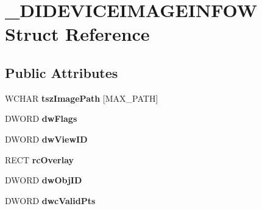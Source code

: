 \hypertarget{struct___d_i_d_e_v_i_c_e_i_m_a_g_e_i_n_f_o_w}{\section{\-\_\-\-D\-I\-D\-E\-V\-I\-C\-E\-I\-M\-A\-G\-E\-I\-N\-F\-O\-W Struct Reference}
\label{struct___d_i_d_e_v_i_c_e_i_m_a_g_e_i_n_f_o_w}
}
\subsection*{Public Attributes}
\begin{DoxyCompactItemize}
\item 
\hypertarget{struct___d_i_d_e_v_i_c_e_i_m_a_g_e_i_n_f_o_w_a1b0076cce4e640ed61f6c221c0fc1f78}{W\-C\-H\-A\-R {\bfseries tsz\-Image\-Path} \mbox{[}M\-A\-X\-\_\-\-P\-A\-T\-H\mbox{]}}\label{struct___d_i_d_e_v_i_c_e_i_m_a_g_e_i_n_f_o_w_a1b0076cce4e640ed61f6c221c0fc1f78}

\item 
\hypertarget{struct___d_i_d_e_v_i_c_e_i_m_a_g_e_i_n_f_o_w_a372c889d76f5a3b44fdae9a030ad04ff}{D\-W\-O\-R\-D {\bfseries dw\-Flags}}\label{struct___d_i_d_e_v_i_c_e_i_m_a_g_e_i_n_f_o_w_a372c889d76f5a3b44fdae9a030ad04ff}

\item 
\hypertarget{struct___d_i_d_e_v_i_c_e_i_m_a_g_e_i_n_f_o_w_a2ee07bbebb3b016026c959537b892cff}{D\-W\-O\-R\-D {\bfseries dw\-View\-I\-D}}\label{struct___d_i_d_e_v_i_c_e_i_m_a_g_e_i_n_f_o_w_a2ee07bbebb3b016026c959537b892cff}

\item 
\hypertarget{struct___d_i_d_e_v_i_c_e_i_m_a_g_e_i_n_f_o_w_acad0625bd806762d89f5dbcf1d0720a0}{R\-E\-C\-T {\bfseries rc\-Overlay}}\label{struct___d_i_d_e_v_i_c_e_i_m_a_g_e_i_n_f_o_w_acad0625bd806762d89f5dbcf1d0720a0}

\item 
\hypertarget{struct___d_i_d_e_v_i_c_e_i_m_a_g_e_i_n_f_o_w_a2f6307f75cb8189afaa139d92f113f93}{D\-W\-O\-R\-D {\bfseries dw\-Obj\-I\-D}}\label{struct___d_i_d_e_v_i_c_e_i_m_a_g_e_i_n_f_o_w_a2f6307f75cb8189afaa139d92f113f93}

\item 
\hypertarget{struct___d_i_d_e_v_i_c_e_i_m_a_g_e_i_n_f_o_w_a7012db3a7a411ad3df4c146f3ed4ef40}{D\-W\-O\-R\-D {\bfseries dwc\-Valid\-Pts}}\label{struct___d_i_d_e_v_i_c_e_i_m_a_g_e_i_n_f_o_w_a7012db3a7a411ad3df4c146f3ed4ef40}


\end{DoxyCompactItemize}
